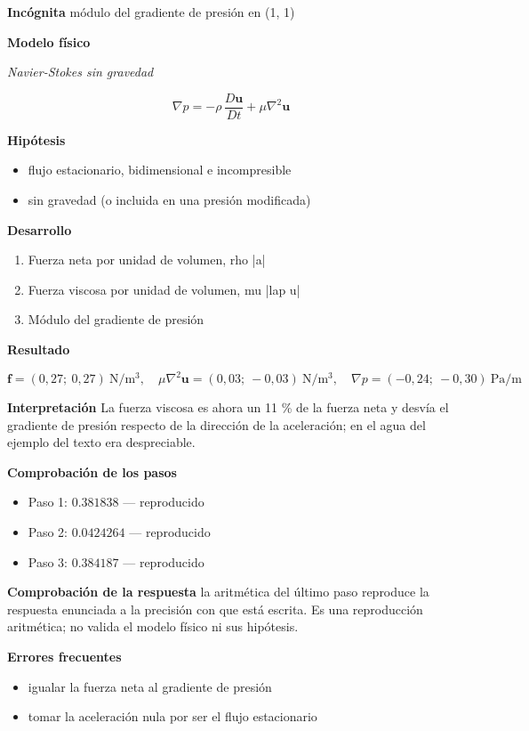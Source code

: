\documentclass[10pt,openany]{book}
\begin{document}
\noindent\textbf{Incógnita}
módulo del gradiente de presión en (1, 1)

\noindent\textbf{Modelo físico}

\noindent\textit{Navier-Stokes sin gravedad}

\[
\nabla p = -\rho\,\frac{D\mathbf{u}}{Dt} + \mu\nabla^{2}\mathbf{u}
\]

\noindent\textbf{Hipótesis}
\begin{itemize}
\item flujo estacionario, bidimensional e incompresible
\item sin gravedad (o incluida en una presión modificada)
\end{itemize}

\noindent\textbf{Desarrollo}
\begin{enumerate}
\item
Fuerza neta por unidad de volumen, rho |a|
\item
Fuerza viscosa por unidad de volumen, mu |lap u|
\item
Módulo del gradiente de presión
\end{enumerate}

\noindent\textbf{Resultado}

\[
\mathbf{f} = (0{,}27;\ 0{,}27)\ \mathrm{N/m^{3}},\quad \mu\nabla^{2}\mathbf{u} = (0{,}03;\ -0{,}03)\ \mathrm{N/m^{3}},\quad \nabla p = (-0{,}24;\ -0{,}30)\ \mathrm{Pa/m}
\]

\noindent\textbf{Interpretación}
La fuerza viscosa es ahora un 11 \% de la fuerza neta y desvía el gradiente de presión respecto de la dirección de la aceleración; en el agua del ejemplo del texto era despreciable.

\noindent\textbf{Comprobación de los pasos}
\begin{itemize}
\item Paso 1: $0.381838$ — reproducido
\item Paso 2: $0.0424264$ — reproducido
\item Paso 3: $0.384187$ — reproducido
\end{itemize}

\noindent\textbf{Comprobación de la respuesta} la aritmética del último paso reproduce la respuesta enunciada a la precisión con que está escrita. Es una reproducción aritmética; no valida el modelo físico ni sus hipótesis.

\noindent\textbf{Errores frecuentes}
\begin{itemize}
\item igualar la fuerza neta al gradiente de presión
\item tomar la aceleración nula por ser el flujo estacionario
\end{itemize}
\end{document}
